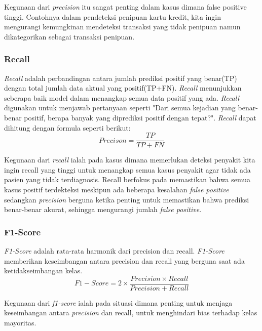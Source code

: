 Kegunaan dari \textit{precision} itu sangat penting dalam kasus dimana false positive tinggi. Contohnya dalam pendeteksi penipuan kartu kredit, kita ingin mengurangi kemungkinan mendeteksi transaksi yang tidak penipuan namun dikategorikan sebagai transaksi penipuan.
   
\subsubsection{Recall}
\textit{Recall} adalah perbandingan antara jumlah prediksi positif yang benar(TP) dengan total jumlah data aktual yang positif(TP+FN). \textit{Recall} menunjukkan seberapa baik model dalam menangkap semua data positif yang ada. \textit{Recall} digunakan untuk menjawab pertanyaan seperti "Dari semua kejadian yang benar-benar positif, berapa banyak yang diprediksi positif dengan tepat?". \textit{Recall} dapat dihitung dengan formula seperti berikut:\\
\begin{equation}
Precison = \frac{TP}{TP + FN} 
\end{equation}
\label{eq:2.recall}

Kegunaan dari \textit{recall} ialah pada kasus dimana memerlukan deteksi penyakit kita ingin recall yang tinggi untuk menangkap semua kasus penyakit agar tidak ada pasien yang tidak terdiagnosis. Recall berfokus pada  memastikan bahwa semua kasus positif terdekteksi meskipun ada beberapa kesalahan \textit{false positive} sedangkan \textit{precision} berguna ketika penting untuk memastikan bahwa prediksi benar-benar akurat, sehingga mengurangi jumlah \textit{false positive}.


\subsubsection{F1-Score}
\textit{F1-Score} adalah rata-rata harmonik dari precision dan recall. \textit{F1-Score} memberikan keseimbangan antara precision dan recall yang berguna saat ada ketidakseimbangan kelas.\\
\begin{equation}
F1-Score = 2 \times \frac{Precision \times Recall}{Precision + Recall}   
\end{equation}
\label{eq:2.f1score}

Kegunaan dari \textit{f1-score} ialah pada situasi dimana penting untuk menjaga keseimbangan antara \textit{precision} dan recall, untuk menghindari bias terhadap kelas mayoritas.    

